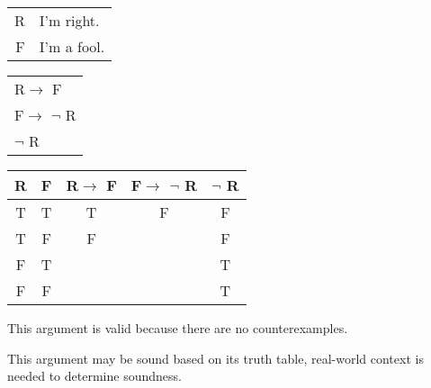 \section{}
\centering
\begin{tabular}{r l}
    R & I'm right. \\
    F & I'm a fool.
\end{tabular}
\begin{tabular}{l}
    R$\rightarrow$ F\\
    F$\rightarrow$ $\lnot$ R\\
    \hline
    $\lnot$ R
\end{tabular}

\begin{tabular}{c|c||c|c||c}
    R & F & R$\rightarrow$ F & F$\rightarrow$ $\lnot$ R & $\lnot$ R \\
    \hline
    T & T & T & F & F \\
    T & F & F &   & F \\
    F & T &   &   & T \\
    F & F &   &   & T
\end{tabular}

\justifying
\noindent This argument is valid because there are no counterexamples.

\noindent This argument may be sound based on its truth table, real-world context is needed to determine soundness.